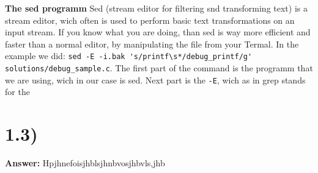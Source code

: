 \documentclass{article}
\begin{document}
\singlespacing

\textbf{The sed programm}
Sed (stream editor for filtering snd transforming text) is a stream editor, wich often is used to perform basic text transformations on an input stream. If you know what you are doing, than sed is way more efficient and faster than a normal editor, by manipulating the file from your Termal. In the example we did: \verb!sed -E -i.bak 's/printf\s*/debug_printf/g' solutions/debug_sample.c!. The first part of the command is the programm that we are using, wich in our case is sed. Next part is the \verb!-E!, wich as in grep stands for the


\section{1.3)}

\textbf{Answer:} Hpjhnefoisjhblsjhnbvosjhbvls,jhb
\end{document}
